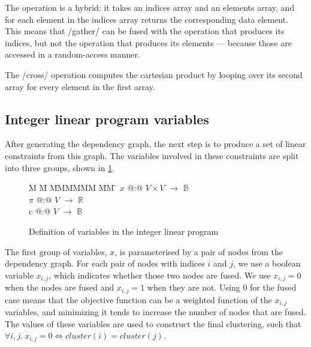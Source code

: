 The \Hs@gather@ operation is a hybrid: it takes an indices array and an elements array, and for each element in the indices array returns the corresponding data element.
This means that \Hs/gather/ can be fused with the operation that produces its indices, but not the operation that produces its elements --- because those are accessed in a random-access manner. 

The \Hs/cross/ operation computes the cartesian product by looping over its second array for every element in the first array.




\subsection{Integer linear program variables}
After generating the dependency graph, the next step is to produce a set of linear constraints from this graph.
The variables involved in these constraints are split into three groups, shown in \cref{fig:clustering:ilp-vars}.

\begin{figure}
\centering
\parbox{0cm}{
\begin{tabbing}
M   \= M \= MMMMMM \= MM \= \kill
$x$   \> @:@  \> $V \times V$ \> $\to$ \> $\mathbb{B}$ \\
$\pi$ \> @:@  \> $V$             \> $\to$ \> $\mathbb{R}$ \\
$c$   \> @:@  \> $V$             \> $\to$ \> $\mathbb{B}$
\end{tabbing}
}
\caption{Definition of variables in the integer linear program}
\label{fig:clustering:ilp-vars}
\end{figure}


The first group of variables, $x$, is parameterised by a pair of nodes from the dependency graph.
For each pair of nodes with indices $i$ and $j$, we use a boolean variable $x_{i,j}$, which indicates whether those two nodes are fused.
We use $x_{i,j} = 0$ when the nodes are fused and $x_{i,j} = 1$ when they are not.
Using $0$ for the fused case means that the objective function can be a weighted function of the $x_{i,j}$ variables, and minimizing it tends to increase the number of nodes that are fused.
The values of these variables are used to construct the final clustering, such that $\forall i,j.\ x_{i,j} = 0 \iff \mathit{cluster}(i) = \mathit{cluster}(j)$.

